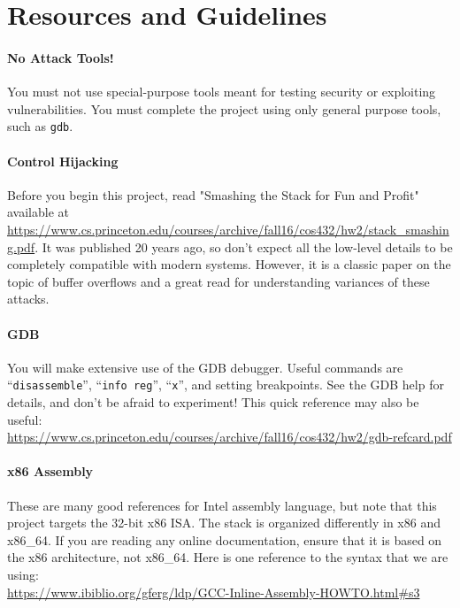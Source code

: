\documentclass[letterpaper,12pt]{report}
\begin{document}
{\begin{enumerate}
\end{enumerate}



\section*{Resources and Guidelines}

\vspace{-3pt} \paragraph{No Attack Tools!} You must not use special-purpose
tools meant for testing security or exploiting vulnerabilities.  You must
complete the project using only general purpose tools, such as \texttt{gdb}.

\vspace{-6pt} 
\paragraph{Control Hijacking} 
Before you begin this project, read
"Smashing the Stack for Fun and Profit" available at
\url{https://www.cs.princeton.edu/courses/archive/fall16/cos432/hw2/stack_smashing.pdf}.  
It was published 20 years ago, so don't expect all the low-level details to be
completely compatible with modern systems. However, it is a classic
paper on the topic of buffer overflows and a great read for
understanding variances of these attacks.

\vspace{-6pt}
\paragraph{GDB}
You will make extensive use of the GDB debugger. Useful commands 
are ``\texttt{disassemble}'', ``\texttt{info reg}'', ``\texttt{x}'',
and setting breakpoints. See the GDB help for details, and don't be afraid to
experiment!  This quick reference may also be useful: \\
\url{https://www.cs.princeton.edu/courses/archive/fall16/cos432/hw2/gdb-refcard.pdf}

\vspace{-6pt} \paragraph{x86 Assembly} These are many good references for Intel
assembly language, but note that this project targets the 32-bit x86 ISA.  The
stack is organized differently in x86 and x86\_64. If you are reading any online
documentation, ensure that it is based on the x86 architecture, not  x86\_64.
Here is one reference to the syntax that we are using: \\
\url{https://www.ibiblio.org/gferg/ldp/GCC-Inline-Assembly-HOWTO.html#s3}

}
\end{document}
